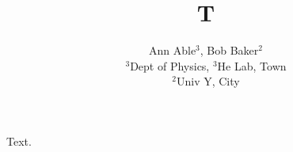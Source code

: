 \documentclass{article}
\begin{document}
\title{T}
\author{Ann Able$^{3}$, Bob Baker$^{2}$ \\ $^3$Dept of Physics, $^{3}$He Lab, Town \\ $^2$Univ Y, City}
\maketitle
Text.
\end{document}
